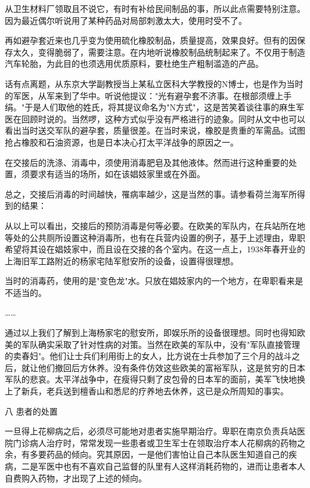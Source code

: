 \documentclass[12pt,UTF8]{ctexbook}
\begin{document}
从卫生材料厂领取且不说它，有时有补给民间制品的事，所以此点需要特别注意。因为最近偶尔听说用了某种药品对局部刺激太大，使用时受不了。



再如避孕套近来也几乎变为使用硫化橡胶制品，质量提高，效果良好。但有的因保存太久，变得脆弱了，需要注意。在内地听说橡胶制品统制起来了。不仅用于制造汽车轮胎，为此目的也须选用优质原料，要杜绝生产粗制滥造的产品。

话有点离题，从东京大学副教授当上某私立医科大学教授的N博士，也是作为当时的军医，从军来到了华中。听说他提议："光有避孕套不济事。在根部须缠上手绢。"于是人们取他的姓氏，将其提议命名为"N方式"，这是苦笑着谈往事的麻生军医在回顾时说的。当然啰，这种方式似乎没有严格进行的迹象。同时从文中也可以看出当时送交军队的避孕套，质量很差。在当时来说，橡胶是贵重的军需品。试图抢占橡胶和石油资源，也是日本决心打太平洋战争的原因之一。



在交接后的洗涤、消毒中，须使用消毒肥皂及其他液体。然而进行这种重要的处置，须要求有适当的场所，如在该娼妓家里或在外面。



总之，交接后消毒的时间越快，罹病率越少，这是当然的事。请参看荷兰海军所得到的结果：



从以上可以看出，交接后的预防消毒是何等必要。在欧美的军队内，在兵站所在地等处的公共厕所设置这种消毒所，也有在兵营内设置的例子，基于上述理由，卑职希望将其设在娼妓家中，而且设在交接的各个室内。在这一点上，1938年春开业的上海旧军工路附近的杨家宅陆军慰安所的设备，设置得很理想。



当时的消毒药，使用的是"变色龙"水。只放在娼妓家内的一个地方，在卑职看来是不适当的。



……



通过以上我们了解到上海杨家宅的慰安所，即娱乐所的设备很理想。同时也得知欧美的军队确实采取了针对性病的对策。当然在欧美的军队中，没有"军队直接管理的卖春妇"。他们让士兵们利用街上的女人，比方说在士兵参加了三个月的战斗之后，就让他们撤回后方休养。没有条件仿效这些欧美的富裕军队，这是贫穷的日本军队的悲哀。太平洋战争中，在瘦得只剩了皮包骨的日本军的面前，美军飞快地换上了新兵，老兵送到檀香山和悉尼的疗养地去休养，这已是众所周知的事实。



八 患者的处置



一旦得上花柳病之后，必须尽可能地对患者实施早期治疗。卑职在南京负责兵站医院门诊病人治疗时，常常发现一些患者或卫生军士在领取治疗本人花柳病的药物之余，有多要药品的倾向。究其原因，一是他们害怕让自己本队医生知道自己的疾病，二是军医中也有不喜欢自己监督的队里有人这样消耗药物的，进而让患者本人自费购入药物，才出现了上述的倾向。
\end{document}
